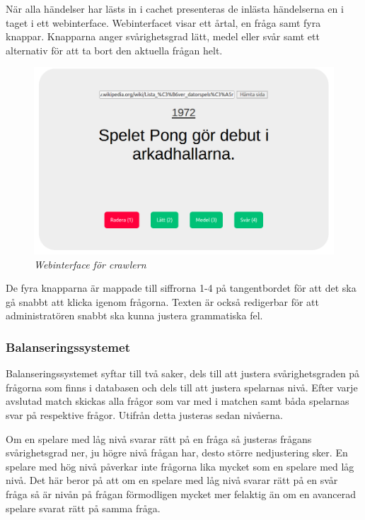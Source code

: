 \documentclass[12pt,a4paper]{article}
\begin{document}
När alla  händelser har lästs in i cachet presenteras de inlästa händelserna en i taget i ett webinterface. Webinterfacet visar ett årtal, en fråga samt fyra knappar. Knapparna anger svårighetsgrad lätt, medel eller svår samt ett alternativ för att ta bort den aktuella frågan helt.

\begin{figure}[H]
	\begin{centering}
	\includegraphics[width=\textwidth]{crawler} 
	\end{centering}
	\caption{\textit{Webinterface för crawlern}}
\end{figure}

De fyra knapparna är mappade till siffrorna 1-4 på tangentbordet för att det ska gå snabbt att klicka igenom frågorna. Texten är också redigerbar för att administratören snabbt ska kunna justera grammatiska fel.

\subsubsection{Balanseringssystemet}
Balanseringssystemet syftar till två saker, dels till att justera svårighetsgraden på frågorna som finns i databasen och dels till att justera spelarnas nivå. Efter varje avslutad match skickas alla frågor som var med i matchen samt båda spelarnas svar på respektive frågor. Utifrån detta justeras sedan nivåerna.

Om en spelare med låg nivå svarar rätt på en fråga så justeras frågans svårighetsgrad ner, ju högre nivå frågan har, desto större nedjustering sker. En spelare med hög nivå påverkar inte frågorna lika mycket som en spelare med låg nivå. Det här beror på att om en spelare med låg nivå svarar rätt på en svår fråga så är nivån på frågan förmodligen mycket mer felaktig än om en avancerad spelare svarat rätt på samma fråga. 
\end{document}
